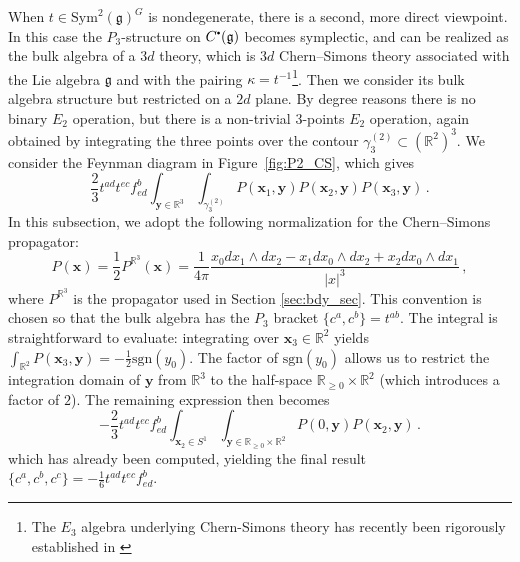 \documentclass[11pt]{article}
\newcommand{\R}{\mathbb{R}}
\newcommand\sbullet[1][.5]{\mathbin{\vcenter{\hbox{\scalebox{#1}{$\bullet$}}}}}
\numberwithin{equation}{section}
\begin{document}
When $t\in \mathrm{Sym}^2(\mathfrak{g})^G$ is nondegenerate, there is a second, more direct viewpoint. In this case the $P_3$-structure on $C^{\sbullet}(\mathfrak{g})$ becomes symplectic, and can be realized as the bulk algebra of a $3d$ theory, which is $3d$ Chern--Simons theory associated with the Lie algebra $\mathfrak{g}$ and with the pairing $\kappa = t^{-1}$\footnote{The $E_3$ algebra underlying Chern-Simons theory has recently been rigorously established in \cite{costello2026chern}}. Then we consider its bulk algebra structure but restricted on a $2d$ plane. By degree reasons there is no binary $E_2$ operation, but there is a non-trivial $3$-points $E_2$ operation,  again obtained by integrating the three points over the contour $\gamma_3^{(2)} \subset (\R^2)^3$. We consider the Feynman diagram in Figure~\ref{fig:P2_CS}, which gives
\begin{equation}
	\frac{2}{3}t^{ad}t^{ec}f_{ed}^b\int_{\boldsymbol{y}\in \R^3}\int_{\gamma_3^{(2)}} P(\boldsymbol{x}_1,\boldsymbol{y})P(\boldsymbol{x}_2,\boldsymbol{y})P(\boldsymbol{x}_3,\boldsymbol{y})\,.
\end{equation}
In this subsection, we adopt the following normalization for the Chern--Simons propagator:
\begin{equation}
P(\boldsymbol{x}) = \frac{1}{2}P^{\R^{3}}(\boldsymbol{x}) =  \frac{1}{4\pi}\frac{x_0dx_1\wedge dx_2 - x_1dx_0\wedge dx_2 + x_2dx_0\wedge dx_1}{|x|^3}\,,
\end{equation}
where $P^{\R^3}$ is the propagator used in Section \ref{sec:bdy_sec}. This convention is chosen so that the bulk algebra has the $P_3$ bracket $\{c^a,c^b\} = t^{ab}$. The integral is straightforward to evaluate: integrating over $\boldsymbol{x}_3 \in \R^2$ yields $\int_{\R^2}P(\boldsymbol{x}_3,\boldsymbol{y}) = -\frac{1}{2}\mathrm{sgn}(y_0)$. The factor of $\mathrm{sgn}(y_0)$ allows us to restrict the integration domain of $\boldsymbol{y}$ from $\R^3$ to the half-space $\R_{\geq 0}\times \R^2$ (which introduces a factor of $2$). The remaining expression then becomes
\begin{equation}
	-\frac{2}{3}t^{ad}t^{ec}f_{ed}^b\int_{\boldsymbol{x}_2 \in S^1}\int_{\boldsymbol{y}\in \R_{\geq 0}\times \R^2}P(0,\boldsymbol{y})P(\boldsymbol{x}_2,\boldsymbol{y})\,.
\end{equation}
which has already been computed, yielding the final result $\{c^a,c^b,c^c\} = - \frac{1}{6} t^{ad}t^{ec}f_{ed}^b$.
\end{document}
